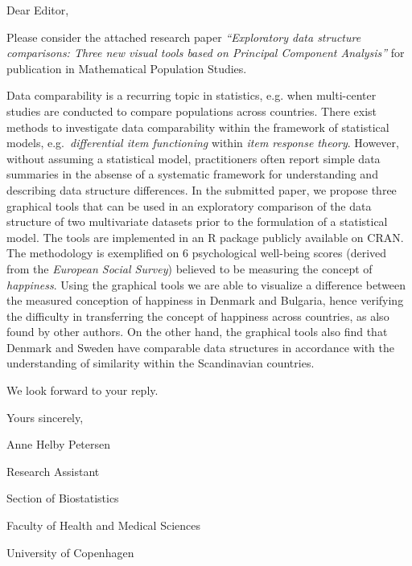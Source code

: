 \documentclass[12pt,a4paper]{article}
\begin{document}
Dear Editor,

\bigskip

Please consider the attached research paper \emph{``Exploratory data structure comparisons: Three new visual tools based on Principal Component Analysis''} for publication in Mathematical Population Studies.

\bigskip

Data comparability is a recurring topic in statistics, e.g. when multi-center studies are conducted to compare populations across countries. There exist methods to investigate data comparability within the framework of statistical models, e.g.\ \emph{differential item functioning} within \emph{item response theory}. However, without assuming a statistical model, practitioners often report simple data summaries in the absense of a systematic framework for understanding and describing data structure differences. In the submitted paper, we propose three graphical tools that can be used in an exploratory comparison of the data structure of two multivariate datasets prior to the formulation of a statistical model. The tools are implemented in an R package publicly available on CRAN. The methodology is exemplified on 6 psychological well-being scores (derived from the \emph{European Social Survey}) believed to be measuring the concept of \emph{happiness}. Using the graphical tools we are able to visualize a difference between the measured conception of happiness in Denmark and Bulgaria, hence verifying the difficulty in transferring the concept of happiness across countries, as also found by other authors. On the other hand, the graphical tools also find that Denmark and Sweden have comparable data structures in accordance with the understanding of similarity within the Scandinavian countries.

\bigskip

We look forward to your reply.

\bigskip\bigskip

Yours sincerely,

\bigskip

Anne Helby Petersen

Research Assistant

Section of Biostatistics

Faculty of Health and Medical Sciences

University of Copenhagen
\end{document}
